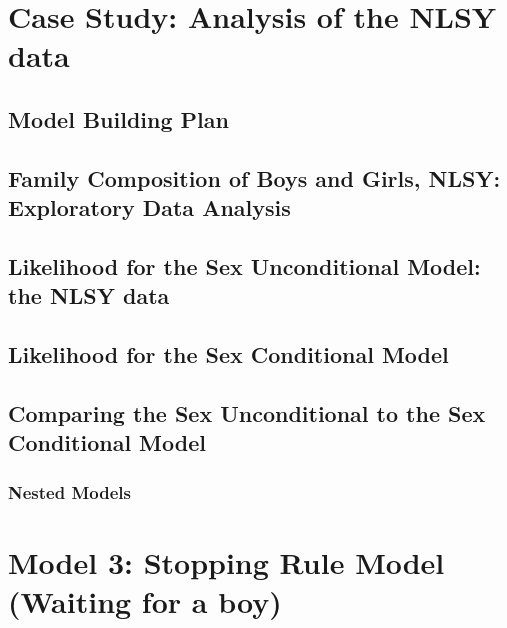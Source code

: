 \documentclass[
]{krantz}
\begin{document}
\hypertarget{case-study-analysis-of-the-nlsy-data}{%
\section{Case Study: Analysis of the NLSY data}\label{case-study-analysis-of-the-nlsy-data}}

\hypertarget{model-building-plan}{%
\subsection{Model Building Plan}\label{model-building-plan}}

\hypertarget{EDA.sec}{%
\subsection{Family Composition of Boys and Girls, NLSY: Exploratory Data Analysis}\label{EDA.sec}}

\hypertarget{likelihood-for-the-sex-unconditional-model-the-nlsy-data}{%
\subsection{Likelihood for the Sex Unconditional Model: the NLSY data}\label{likelihood-for-the-sex-unconditional-model-the-nlsy-data}}

\hypertarget{sex_cond_lik.sec}{%
\subsection{Likelihood for the Sex Conditional Model}\label{sex_cond_lik.sec}}

\hypertarget{sec-lrtest}{%
\subsection{Comparing the Sex Unconditional to the Sex Conditional Model}\label{sec-lrtest}}

\hypertarget{nested-models}{%
\subsubsection{Nested Models}\label{nested-models}}

\hypertarget{model-3-stopping-rule-model-waiting-for-a-boy}{%
\section{Model 3: Stopping Rule Model (Waiting for a boy)}\label{model-3-stopping-rule-model-waiting-for-a-boy}}
\end{document}
